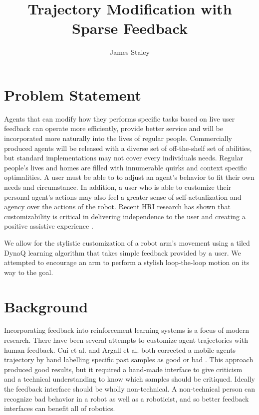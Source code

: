 \documentclass{article}
\title{Trajectory Modification with Sparse Feedback}
\author{James Staley}
\begin{document}
\maketitle

\section{Problem Statement}

Agents that can modify how they performs specific tasks based on live user feedback can operate more efficiently, provide better service and will be incorporated more naturally into the lives of regular people. Commercially produced agents will be released with a diverse set of off-the-shelf set of abilities, but standard implementations may not cover every individuals needs. Regular people's lives and homes are filled with innumerable quirks and context specific optimalities. A user must be able to to adjust an agent's behavior to fit their own needs and circumstance. In addition, a user who is able to customize their personal agent's actions may also feel a greater sense of self-actualization and agency over the actions of the robot. Recent HRI research has shown that customizability is critical in delivering independence to the user and creating a positive assistive experience \cite{bhattacharjee_community-centered_2019}. 

We allow for the stylistic customization of a robot arm's movement using a tiled DynaQ learning algorithm that takes simple feedback provided by a user. We attempted to encourage an arm to perform a stylish loop-the-loop motion on its way to the goal.

\section{Background}

Incorporating feedback into reinforcement learning systems is a focus of modern research. There have been several attempts to customize agent trajectories with human feedback. Cui et al. and Argall et al. both corrected a mobile agents trajectory by hand labelling specific past samples as good or bad \cite{cui_active_2018} \cite{argall_learning_2007}. This approach produced good results, but it required a hand-made interface to give criticism and a technical understanding to know which samples should be critiqued. Ideally the feedback interface should be wholly non-technical. A non-technical person can recognize bad behavior in a robot as well as a roboticist, and so better feedback interfaces can benefit all of robotics. 
\end{document}
